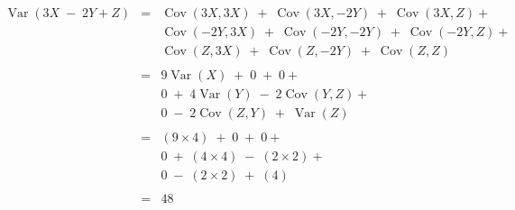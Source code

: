 \documentclass[a4paper,12pt]{article}
\begin{document}
\begin{eqnarray*} 
\operatorname {Var}(3X \;-\; 2Y + Z) &=& 
\operatorname {Cov}(3X,3X) \; + \; \operatorname {Cov}(3X,-2Y) \; +\; \operatorname {Cov}(3X,Z ) + \\
& & \operatorname {Cov}(-2Y,3X) \; + \; \operatorname {Cov}(-2Y,-2Y) \; +\; \operatorname {Cov}(-2Y,Z ) + \\
& & \operatorname {Cov}(Z,3X) \; + \; \operatorname {Cov}(Z,-2Y) \; +\; \operatorname {Cov}(Z,Z )  \\
& & \\
&=& 9 \operatorname {Var}(X) \; + \; 0 \; +\; 0 + \\
& & 0\; + \; 4 \operatorname {Var}(Y) \; -\; 2\operatorname {Cov}(Y,Z ) + \\
& & 0 \; - \; 2 \operatorname {Cov}(Z,Y) \; +\; \operatorname {Var}(Z )  \\
& & \\
&=& (9 \times 4) \; + \; 0 \; +\; 0 + \\
& & 0\; + \; ( 4 \times 4) \; -\; ( 2 \times 2 ) + \\
& & 0 \; - \; ( 2 \times 2 ) \; +\; ( 4)  \\
& & \\
&=& 48
\end{eqnarray*}
\end{document}
